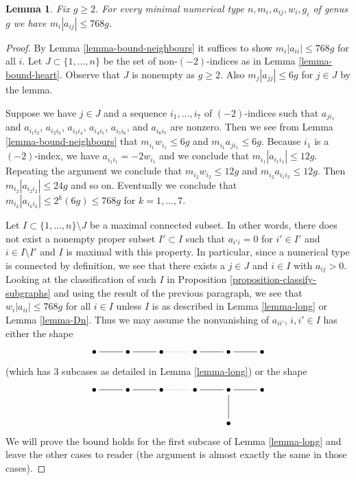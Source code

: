 \documentclass{stacks-project}
\theoremstyle{plain}
\newtheorem{lemma}[subsection]{Lemma}
\theoremstyle{definition}
\theoremstyle{remark}
\numberwithin{equation}{subsection}
\begin{document}
\begin{lemma}
\label{lemma-bound-wm}
Fix $g \geq 2$. For every minimal numerical type $n, m_i, a_{ij}, w_i, g_i$
of genus $g$ we have $m_i|a_{ij}| \leq 768g$.
\end{lemma}

\begin{proof}
By Lemma \ref{lemma-bound-neighbours} it suffices to show
$m_i|a_{ii}| \leq 768g$ for all $i$.
Let $J \subset \{1, \ldots, n\}$ be the set of non-$(-2)$-indices
as in Lemma \ref{lemma-bound-heart}. Observe that $J$ is
nonempty as $g \geq 2$. Also $m_j|a_{jj}| \leq 6g$ for $j \in J$
by the lemma.

\medskip\noindent
Suppose we have $j \in J$ and a sequence $i_1, \ldots, i_7$
of $(-2)$-indices such that $a_{ji_1}$ and $a_{i_1i_2}$,
$a_{i_2i_3}$, $a_{i_3i_4}$, $a_{i_4i_5}$, $a_{i_5i_6}$, and
$a_{i_6i_7}$ are nonzero. Then we see from
Lemma \ref{lemma-bound-neighbours}
that $m_{i_1}w_{i_1} \leq 6g$ and $m_{i_1}a_{ji_1} \leq 6g$.
Because $i_1$ is a $(-2)$-index, we have $a_{i_1i_1} = -2w_{i_1}$
and we conclude that $m_{i_1}|a_{i_1i_1}| \leq 12g$.
Repeating the argument we conclude that
$m_{i_2}w_{i_2} \leq 12g$ and $m_{i_2}a_{i_1i_2} \leq 12g$.
Then $m_{i_2}|a_{i_2i_2}| \leq 24g$ and so on.
Eventually we conclude that
$m_{i_k}|a_{i_ki_k}| \leq 2^k(6g) \leq 768g$ for $k = 1, \ldots, 7$.

\medskip\noindent
Let $I \subset \{1, \ldots, n\} \setminus J$ be a maximal connected subset.
In other words, there does not exist a nonempty proper subset
$I' \subset I$ such that
$a_{i'i} = 0$ for $i' \in I'$ and $i \in I \setminus I'$
and $I$ is maximal with this property. In particular, since
a numerical type is connected by definition, we see that there
exists a $j \in J$ and $i \in I$ with $a_{ij} > 0$.
Looking at the classification
of such $I$ in Proposition \ref{proposition-classify-subgraphs}
and using the result of the previous paragraph, we see that
$w_i|a_{ii}| \leq 768g$ for all $i \in I$ unless $I$ is as described in
Lemma \ref{lemma-long} or
Lemma \ref{lemma-Dn}.
Thus we may assume the nonvanishing of $a_{ii'}$, $i, i' \in I$
has either the shape
$$
\xymatrix{
\bullet \ar@{-}[r] &
\bullet \ar@{-}[r] &
\bullet \ar@{..}[r] &
\bullet \ar@{-}[r] &
\bullet \ar@{-}[r] &
\bullet
}
$$
(which has 3 subcases as detailed in Lemma \ref{lemma-long})
or the shape
$$
\xymatrix{
\bullet \ar@{-}[r] &
\bullet \ar@{-}[r] &
\bullet \ar@{..}[r] &
\bullet \ar@{-}[r] &
\bullet \ar@{-}[r] \ar@{-}[d] &
\bullet \\
& & & & \bullet
}
$$
We will prove the bound holds for the first subcase of
Lemma \ref{lemma-long} and leave the other cases to reader (the argument
is almost exactly the same in those cases).


\end{proof}
\end{document}
